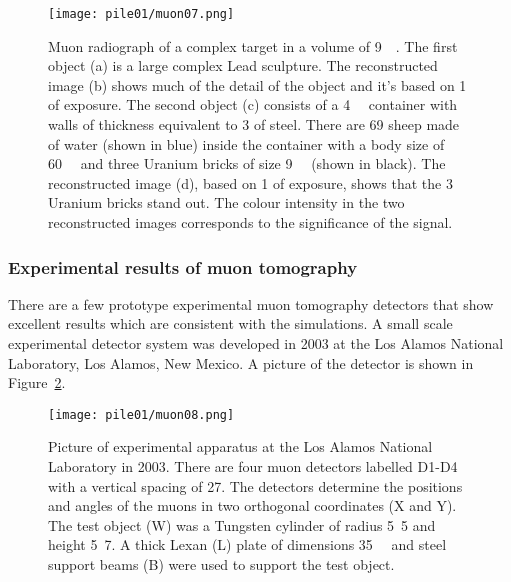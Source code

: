 \documentclass[twoside,titlepage,11pt,twocolumn,a4paper]{article}
\begin{document}
\begin{figure}
  \texttt{[image: pile01/muon07.png]}
  \caption{Muon radiograph of a complex target in a volume of
    \unit{9}{\cubic\metre}. The first object (a) is a
    large complex Lead sculpture. The reconstructed image (b) shows
    much of the detail of the object and it’s based on
    \unit{1}{\minute} of exposure. The second object (c) consists of a
    \unit{4}{\cubic\metre} container with walls of
    thickness equivalent to \unit{3}{\milli\metre} of steel. There are
    69 sheep made of water (shown in blue) inside the container with a
    body size of \unit{60}{\cubic{\centi\metre}} and
    three Uranium bricks of size
    \unit{9}{\cubic{\centi\metre}} (shown in
    black). The reconstructed image (d), based on \unit{1}{\minute} of
    exposure, shows that the 3 Uranium bricks stand out. The colour
    intensity in the two reconstructed images corresponds to the
    significance of the signal. \citep{Priedhorsky2003}}
  \label{fig:muon07}
\end{figure}

\subsubsection{Experimental results of muon tomography}
There are a few prototype experimental muon tomography detectors that
show excellent results which are consistent with the simulations.  A
small scale experimental detector system was developed in 2003 at the
Los Alamos National Laboratory, Los Alamos, New Mexico.
\citep{Priedhorsky2003} A picture of the detector is shown in
Figure~\ref{fig:muon08}.

\begin{figure}
  \texttt{[image: pile01/muon08.png]}
  \caption{Picture of experimental apparatus at the Los Alamos
    National Laboratory in 2003. There are four muon detectors
    labelled D1-D4 with a vertical spacing of
    \unit{27}{\centi\metre}. The detectors determine the positions and
    angles of the muons in two orthogonal coordinates (X and Y). The
    test object (W) was a Tungsten cylinder of radius
    \unit{5.5}{\centi\metre} and height \unit{5.7}{\centi\metre}. A
    thick Lexan (L) plate of dimensions
    \unit{35}{\cubic{\centi\metre}} and steel support
    beams (B) were used to support the test object. \citep{Priedhorsky2003}}
  \label{fig:muon08}
\end{figure}
\end{document}

